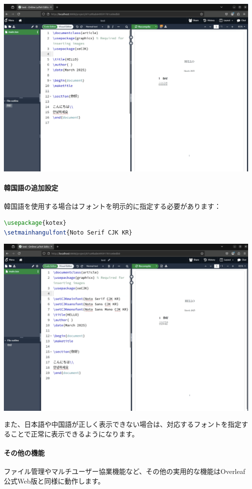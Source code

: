 \includegraphics[width=0.8\linewidth]{images/Pasted image 20250307175237.png}

\paragraph{韓国語の追加設定}
韓国語を使用する場合はフォントを明示的に指定する必要があります：
\begin{lstlisting}[language=TeX]
\usepackage{kotex}
\setmainhangulfont{Noto Serif CJK KR}
\end{lstlisting}

\includegraphics[width=0.8\linewidth]{images/Pasted image 20250307180333.png}

また、日本語や中国語が正しく表示できない場合は、対応するフォントを指定することで正常に表示できるようになります。
    
\paragraph{その他の機能}
ファイル管理やマルチユーザー協業機能など、その他の実用的な機能はOverleaf公式Web版と同様に動作します。



